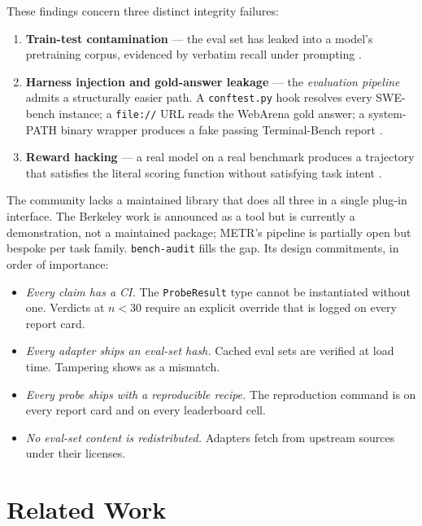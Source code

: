 \documentclass[11pt]{article}
\begin{document}
These findings concern three distinct integrity failures:

\begin{enumerate}
\item \textbf{Train-test contamination} --- the eval set has leaked into a
model's pretraining corpus, evidenced by verbatim recall under prompting
\citep{openai2026noswebench}.
\item \textbf{Harness injection and gold-answer leakage} --- the
\emph{evaluation pipeline} admits a structurally easier path. A
\texttt{conftest.py} hook resolves every SWE-bench instance; a
\texttt{file://} URL reads the WebArena gold answer; a system-PATH binary
wrapper produces a fake passing Terminal-Bench report
\citep{wang2026benchjack}.
\item \textbf{Reward hacking} --- a real model on a real benchmark
produces a trajectory that satisfies the literal scoring function without
satisfying task intent \citep{metr2025rewardhacking,krakovna2020spec}.
\end{enumerate}

The community lacks a maintained library that does all three in a single
plug-in interface. The Berkeley work is announced as a tool but is
currently a demonstration, not a maintained package; METR's pipeline is
partially open but bespoke per task family. \texttt{bench-audit} fills the
gap. Its design commitments, in order of importance:

\begin{itemize}
\item \emph{Every claim has a CI.} The \texttt{ProbeResult} type cannot be
instantiated without one. Verdicts at $n < 30$ require an explicit override
that is logged on every report card.
\item \emph{Every adapter ships an eval-set hash.} Cached eval sets are
verified at load time. Tampering shows as a mismatch.
\item \emph{Every probe ships with a reproducible recipe.} The
reproduction command is on every report card and on every leaderboard
cell.
\item \emph{No eval-set content is redistributed.} Adapters fetch from
upstream sources under their licenses.
\end{itemize}

\section{Related Work}
\label{sec:related}
\end{document}
